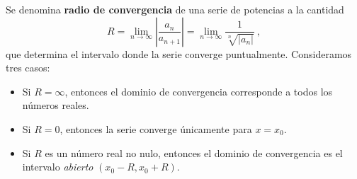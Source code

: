 \begin{defi} 
    Se denomina \textbf{radio de convergencia} de una serie de potencias a la cantidad 
    \begin{equation}
        R = \lim_{n \to \infty} \left| \frac{a_n}{a_{n+1}} \right| = \lim_{n \to \infty} \frac{1}{\sqrt[n]{|a_n|}} \ ,
    \end{equation}
    que determina el intervalo donde la serie converge puntualmente. Consideramos tres casos:
    \begin{itemize}
        \item Si $R = \infty$, entonces el dominio de convergencia corresponde a todos los números reales.
        \item Si $R = 0$, entonces la serie converge únicamente para $x = x_0$.
        \item Si $R$ es un número real no nulo, entonces el dominio de convergencia es el intervalo \emph{abierto} $(x_0 - R, x_0 + R)$.
    \end{itemize}
\end{defi}


